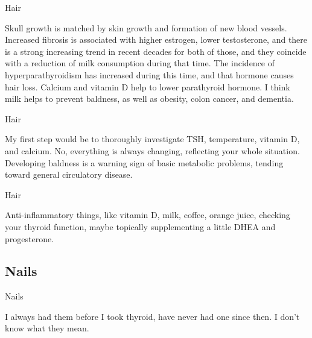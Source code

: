 \documentclass[11pt,oneside,openany,extrafontsizes]{memoir}
\begin{document}
\begin{standalonequote}{Hair}

    \begin{answer}
      Skull growth is matched by skin growth and formation of new blood vessels. Increased fibrosis is associated with higher estrogen, lower testosterone, and there is a strong increasing trend in recent decades for both of those, and they coincide with a reduction of milk consumption during that time. The incidence of hyperparathyroidism has increased during this time, and that hormone causes hair loss. Calcium and vitamin D help to lower parathyroid hormone. I think milk helps to prevent baldness, as well as obesity, colon cancer, and dementia.
    \end{answer}
\end{standalonequote}

\begin{standalonequote}{Hair}

    \begin{answer}
      My first step would be to thoroughly investigate TSH, temperature, vitamin D, and calcium. No, everything is always changing, reflecting your whole situation. Developing baldness is a warning sign of basic metabolic problems, tending toward general circulatory disease.
    \end{answer}
\end{standalonequote}

\begin{standalonequote}{Hair}

    \begin{answer}
      Anti-inflammatory things, like vitamin D, milk, coffee, orange juice, checking your thyroid function, maybe topically supplementing a little DHEA and progesterone.
    \end{answer}
\end{standalonequote}

\subsection{Nails}

\begin{standalonequote}{Nails}

    \begin{answer}
      I always had them before I took thyroid, have never had one since then. I don't know what they mean.
    \end{answer}
\end{standalonequote}
\end{document}
